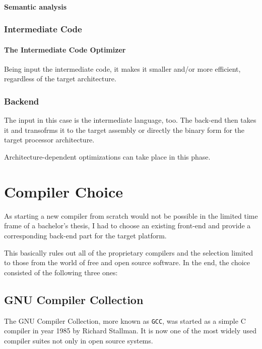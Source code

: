                 
            \subsubsection{Semantic analysis}
            

        \subsection{Intermediate Code}

            \subsubsection{The Intermediate Code Optimizer}

                Being input the intermediate code, it makes it smaller and/or more efficient, regardless of the target architecture.

        \subsection{Back\-end}

            The input in this case is the intermediate language, too. The back-end then takes it and transofrms it to the target assembly or directly the binary form for the target processor architecture.

            Architecture-dependent optimizations can take place in this phase.

\chapter{Compiler Choice}\label{compiler}

As starting a new compiler from scratch would not be possible in the limited time frame of a bachelor's thesis, I had to choose an existing front-end and provide a corresponding back-end part for the target platform.

This basically rules out all of the proprietary compilers and the selection limited to those from the world of free and open source software. In the end, the choice consisted of the following three ones:

    \section{GNU Compiler Collection}

    The GNU Compiler Collection, more known as \texttt{GCC}, was started as a simple C compiler in year 1985 by Richard Stallman. It is now one of the most widely used compiler suites not only in open source systems.


